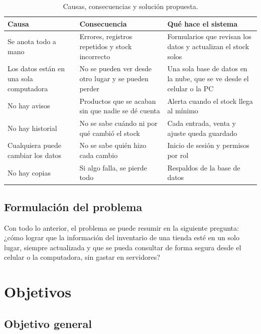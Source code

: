 \documentclass[12pt,a4paper]{article}
\begin{document}
\begin{table}[!htbp]
\centering
\small
\renewcommand{\arraystretch}{1.25}
\begin{tabularx}{\textwidth}{>{\raggedright\arraybackslash}p{3.3cm} >{\raggedright\arraybackslash}X >{\raggedright\arraybackslash}X}
\toprule
\textbf{Causa} & \textbf{Consecuencia} & \textbf{Qué hace el sistema} \\
\midrule
Se anota todo a mano & Errores, registros repetidos y stock incorrecto & Formularios que revisan los datos y actualizan el stock solos \\
Los datos están en una sola computadora & No se pueden ver desde otro lugar y se pueden perder & Una sola base de datos en la nube, que se ve desde el celular o la PC \\
No hay avisos & Productos que se acaban sin que nadie se dé cuenta & Alerta cuando el stock llega al mínimo \\
No hay historial & No se sabe cuándo ni por qué cambió el stock & Cada entrada, venta y ajuste queda guardado \\
Cualquiera puede cambiar los datos & No se sabe quién hizo cada cambio & Inicio de sesión y permisos por rol \\
No hay copias & Si algo falla, se pierde todo & Respaldos de la base de datos \\
\bottomrule
\end{tabularx}
\caption{Causas, consecuencias y solución propuesta.}
\label{tab:causas}
\end{table}

\subsection{Formulación del problema}

Con todo lo anterior, el problema se puede resumir en la siguiente pregunta: ¿cómo lograr que la información del inventario de una tienda esté en un solo lugar, siempre actualizada y que se pueda consultar de forma segura desde el celular o la computadora, sin gastar en servidores?

\section{Objetivos}\label{sec:objetivos}

\subsection{Objetivo general}
\end{document}
